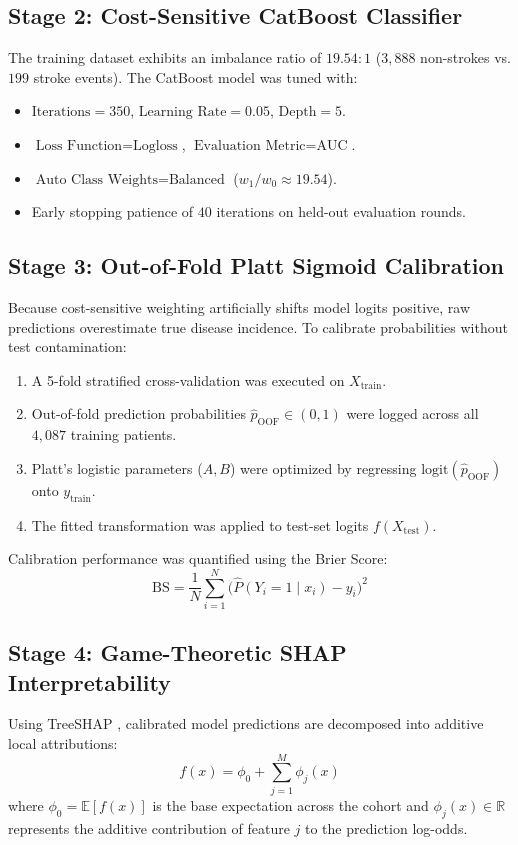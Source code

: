 \documentclass[conference]{IEEEtran}
\begin{document}
\subsection{Stage 2: Cost-Sensitive CatBoost Classifier}
The training dataset exhibits an imbalance ratio of $19.54:1$ ($3,888$ non-strokes vs. $199$ stroke events). The CatBoost model was tuned with:
\begin{itemize}
    \item $\text{Iterations} = 350$, $\text{Learning Rate} = 0.05$, $\text{Depth} = 5$.
    \item $\text{Loss Function} = \text{Logloss}$, $\text{Evaluation Metric} = \text{AUC}$.
    \item $\text{Auto Class Weights} = \text{Balanced}$ ($w_1/w_0 \approx 19.54$).
    \item Early stopping patience of $40$ iterations on held-out evaluation rounds.
\end{itemize}

\subsection{Stage 3: Out-of-Fold Platt Sigmoid Calibration}
Because cost-sensitive weighting artificially shifts model logits positive, raw predictions overestimate true disease incidence. To calibrate probabilities without test contamination:
\begin{enumerate}
    \item A 5-fold stratified cross-validation was executed on $X_{\text{train}}$.
    \item Out-of-fold prediction probabilities $\hat{p}_{\text{OOF}} \in (0, 1)$ were logged across all $4,087$ training patients.
    \item Platt's logistic parameters ($A, B$) were optimized by regressing $\text{logit}(\hat{p}_{\text{OOF}})$ onto $y_{\text{train}}$.
    \item The fitted transformation was applied to test-set logits $f(X_{\text{test}})$.
\end{enumerate}

Calibration performance was quantified using the Brier Score:
\begin{equation}
\text{BS} = \frac{1}{N} \sum_{i=1}^{N} \Big( \hat{P}(Y_i = 1 \mid x_i) - y_i \Big)^2
\label{eq:brier}
\end{equation}

\subsection{Stage 4: Game-Theoretic SHAP Interpretability}
Using TreeSHAP \cite{lundberg2020local}, calibrated model predictions are decomposed into additive local attributions:
\begin{equation}
f(x) = \phi_0 + \sum_{j=1}^{M} \phi_j(x)
\label{eq:shap_additive}
\end{equation}
where $\phi_0 = \mathbb{E}[f(x)]$ is the base expectation across the cohort and $\phi_j(x) \in \mathbb{R}$ represents the additive contribution of feature $j$ to the prediction log-odds.
\end{document}
